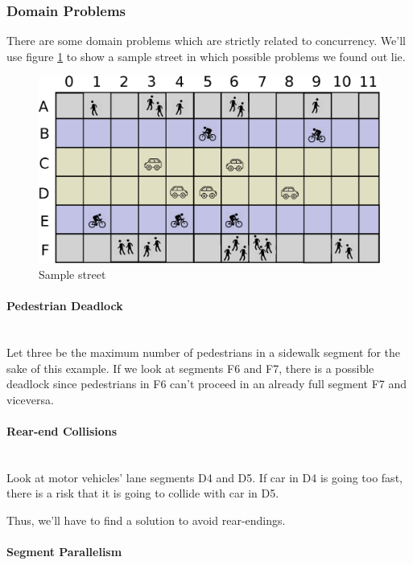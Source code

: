 \subsubsection{Domain Problems}

There are some domain problems which are strictly related to concurrency.
We'll use figure \ref{fig:pa-sample-street} to show a sample street in which
possible problems we found out lie.

\begin{figure}
  \centering
  \includegraphics[width=.7\columnwidth]{sections/images/analysis/street_base.eps}
  \caption{Sample street}
  \label{fig:pa-sample-street}
\end{figure}

\paragraph{Pedestrian Deadlock} \mbox{} \\

Let three be the maximum number of pedestrians in a sidewalk segment for the
sake of this example.
If we look at segments F6 and F7, there is a possible deadlock since
pedestrians in F6 can't proceed in an already full segment F7 and viceversa.

\paragraph{Rear-end Collisions} \mbox{} \\

Look at motor vehicles' lane segments D4 and D5. If car in D4 is going too
fast, there is a risk that it is going to collide with car in D5.

Thus, we'll have to find a solution to avoid rear-endings.

\paragraph{Segment Parallelism} \mbox{} \\

